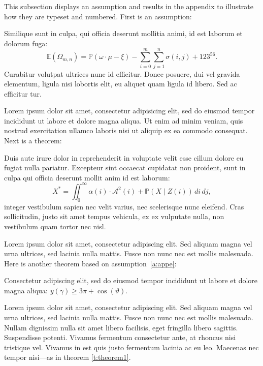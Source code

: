 \documentclass[letterpaper,11pt,leqno]{article}
\begin{document}
This subsection displays an assumption and results in the appendix to illustrate how they are typeset and numbered. First is an assumption:
\begin{assumption} 
Similique sunt in culpa, qui officia deserunt mollitia animi, id est laborum et dolorum fuga:
\begin{equation*}
\mathbb{E}(\Omega_{m,n}) = \mathbb{P}(\omega\cdot \mu - \xi) - \sum_{i=0}^{m}\sum_{j=1}^{n} \sigma(i,j) + 123^{56}.
\end{equation*}
Curabitur volutpat ultrices nunc id efficitur. Donec posuere, dui vel gravida elementum, ligula nisi lobortis elit, eu aliquet quam ligula id libero. Sed ac efficitur tur.
\label{a:appe}\end{assumption}

Lorem ipsum dolor sit amet, consectetur adipisicing elit, sed do eiusmod
tempor incididunt ut labore et dolore magna aliqua. Ut enim ad minim veniam,
quis nostrud exercitation ullamco laboris nisi ut aliquip ex ea commodo
consequat. Next is a theorem:
\begin{theorem}
Duis aute irure dolor in reprehenderit in voluptate velit esse
cillum dolore eu fugiat nulla pariatur. Excepteur sint occaecat cupidatat non
proident, sunt in culpa qui officia deserunt mollit anim id est laborum:
\begin{equation}
X^* =\iint_{0}^{\infty} \alpha(i) \cdot \mathcal{A}^2(i) + \mathbb{P}(X\mid Z(i))\,di\,dj,\end{equation}
integer vestibulum sapien nec velit varius, nec scelerisque nunc eleifend. Cras sollicitudin, justo sit amet tempus vehicula, ex ex vulputate nulla, non vestibulum quam tortor nec nisl. 
\end{theorem}

Lorem ipsum dolor sit amet, consectetur adipiscing elit. Sed aliquam magna vel urna ultrices, sed lacinia nulla mattis. Fusce non nunc nec est mollis malesuada. Here is another theorem based on assumption~\ref{a:appe}:
\begin{theorem}
Consectetur adipiscing elit, sed do eiusmod tempor incididunt ut labore et dolore magna aliqua: $y(\gamma) \geq 3\pi + \cos(\vartheta)$.
\label{t:theorem1}\end{theorem}

Lorem ipsum dolor sit amet, consectetur adipiscing elit. Sed aliquam magna vel urna ultrices, sed lacinia nulla mattis. Fusce non nunc nec est mollis malesuada. Nullam dignissim nulla sit amet libero facilisis, eget fringilla libero sagittis. Suspendisse potenti. Vivamus fermentum consectetur ante, at rhoncus nisi tristique vel. Vivamus in est quis justo fermentum lacinia ac eu leo. Maecenas nec tempor nisi---as in theorem \ref{t:theorem1}.
\end{document}
